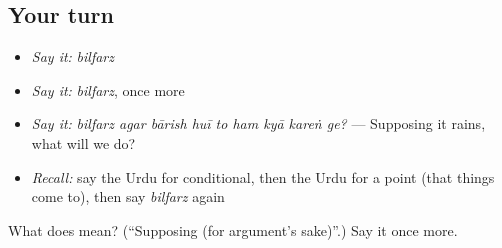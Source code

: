 \subsection*{Your turn}
\begin{itemize}
\raggedright
  \item \emph{Say it:} \emph{bilfarz}
  \item \emph{Say it:} \emph{bilfarz}, once more
  \item \emph{Say it:} \emph{bilfarz agar bārish huī to ham kyā kareṅ ge?} — Supposing it rains, what will we do?
  \item \emph{Recall:} say the Urdu for conditional, then the Urdu for a point (that things come to), then say \emph{bilfarz} again
\end{itemize}

\begin{tcolorbox}[breakable,colback=teal!4,colframe=teal!35!black,title={Before you move on}]
What does  mean? (\textquotedblleft{}Supposing (for argument's sake)\textquotedblright{}.) Say it once more.
\end{tcolorbox}

